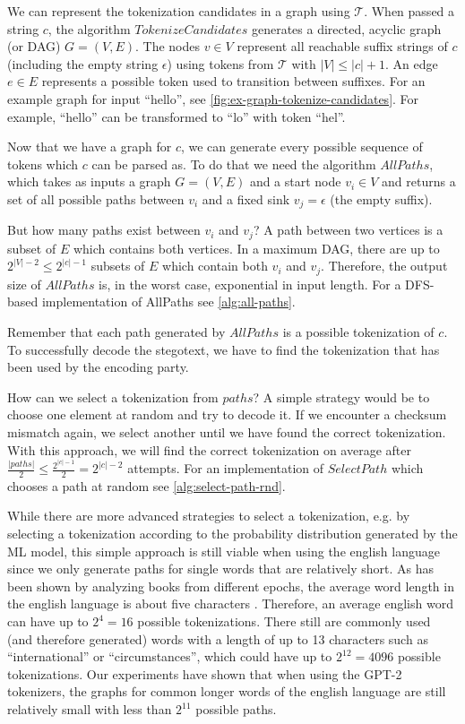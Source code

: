 
We can represent the tokenization candidates in a graph using $\mathcal{T}$.
When passed a string $c$, the algorithm $TokenizeCandidates$ generates a directed, acyclic graph (or DAG) $G = (V, E)$.
The nodes $v \in V$ represent all reachable suffix strings of $c$ (including the empty string $\epsilon$) using tokens from $\mathcal{T}$ with $|V| \leq |c| + 1$. 
An edge $e \in E$ represents a possible token used to transition between suffixes.
For an example graph for input ``hello'', see \autoref{fig:ex-graph-tokenize-candidates}.
For example, ``hello'' can be transformed to ``lo'' with token ``hel''.

Now that we have a graph for $c$, we can generate every possible sequence of tokens which $c$ can be parsed as.
To do that we need the algorithm $AllPaths$, which takes as inputs a graph $G = (V, E)$ and a start node $v_i \in V$ and returns a set of all possible paths between $v_i$ and a fixed sink $v_j = \epsilon$ (the empty suffix).

But how many paths exist between $v_i$ and $v_j$?
A path between two vertices is a subset of $E$ which contains both vertices.
In a maximum DAG, there are up to $2^{|V|-2} \leq 2^{|c|-1}$ subsets of $E$ which contain both $v_i$ and $v_j$.
Therefore, the output size of $AllPaths$ is, in the worst case, exponential in input length.
For a DFS-based implementation of AllPaths see \autoref{alg:all-paths}.

Remember that each path generated by $AllPaths$ is a possible tokenization of $c$.
To successfully decode the stegotext, we have to find the tokenization that has been used by the encoding party.

How can we select a tokenization from $paths$?
A simple strategy would be to choose one element at random and try to decode it.
If we encounter a checksum mismatch again, we select another until we have found the correct tokenization.
With this approach, we will find the correct tokenization on average after $\frac{|paths|}{2} \leq \frac{2^{|c|-1}}{2} = 2^{|c|-2}$ attempts.
For an implementation of $SelectPath$ which chooses a path at random see \autoref{alg:select-path-rnd}.

While there are more advanced strategies to select a tokenization, e.g. by selecting a tokenization according to the probability distribution generated by the ML model, this simple approach is still viable when using the english language since we only generate paths for single words that are relatively short.
As has been shown by analyzing books from different epochs, the average word length in the english language is about five characters \cite{BoShSo2012}.
Therefore, an average english word can have up to $2^4 = 16$ possible tokenizations.
There still are commonly used (and therefore generated) words with a length of up to 13 characters such as ``international'' or ``circumstances'', which could have up to $2^{12} = 4096$ possible tokenizations.
Our experiments have shown that when using the GPT-2 tokenizers, the graphs for common longer words of the english language are still relatively small with less than $2^{11}$ possible paths.



